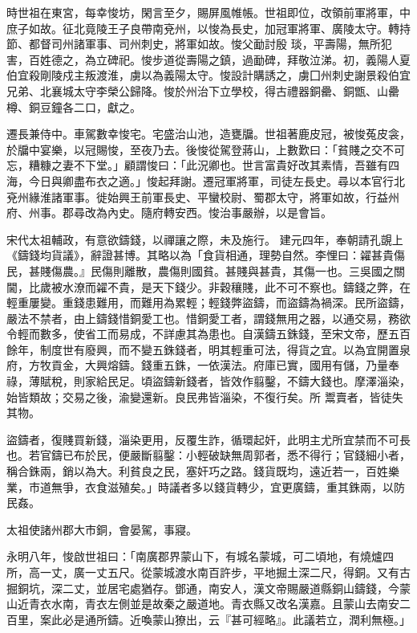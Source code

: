 \begin{pinyinscope}
 時世祖在東宮，每幸悛坊，閑言至夕，賜屏風帷帳。世祖即位，改領前軍將軍，中庶子如故。征北竟陵王子良帶南兗州，以悛為長史，加冠軍將軍、廣陵太守。轉持節、都督司州諸軍事、司州刺史，將軍如故。悛父勔討殷
 琰，平壽陽，無所犯害，百姓德之，為立碑祀。悛步道從壽陽之鎮，過勔碑，拜敬泣涕。初，義陽人夏伯宜殺剛陵戍主叛渡淮，虜以為義陽太守。悛設計購誘之，虜囗州刺史謝景殺伯宜兄弟、北襄城太守李榮公歸降。悛於州治下立學校，得古禮器銅罍、銅甑、山罍樽、銅豆鐘各二口，獻之。



 遷長兼侍中。車駕數幸悛宅。宅盛治山池，造甕牖。世祖著鹿皮冠，被悛菟皮衾，於牖中宴樂，以冠賜悛，至夜乃去。後悛從駕登蔣山，上數歎曰：「貧賤之交不可忘，糟糠之妻不下堂。」顧謂悛曰：「此況卿也。世言富貴好改其素情，吾雖有四海，今日與卿盡布衣之適。」悛起拜謝。遷冠軍將軍，司徒左長史。尋以本官行北兗州緣淮諸軍事。徙始興王前軍長史、平蠻校尉、蜀郡太守，將軍如故，行益州府、州事。郡尋改為內史。隨府轉安西。悛治事嚴辦，以是會旨。



 宋代太祖輔政，有意欲鑄錢，以禪讓之際，未及施行。
 建元四年，奉朝請孔覬上《鑄錢均貨議》，辭證甚博。其略以為「食貨相通，理勢自然。李悝曰：糴甚貴傷民，甚賤傷農。』民傷則離散，農傷則國貧。甚賤與甚貴，其傷一也。三吳國之關閫，比歲被水潦而糴不貴，是天下錢少。非穀穰賤，此不可不察也。鑄錢之弊，在輕重屢變。重錢患難用，而難用為累輕；輕錢弊盜鑄，而盜鑄為禍深。民所盜鑄，嚴法不禁者，由上鑄錢惜銅愛工也。惜銅愛工者，謂錢無用之器，以通交易，務欲令輕而數多，使省工而易成，不詳慮其為患也。自漢鑄五銖錢，至宋文帝，歷五百餘年，制度世有廢興，而不變五銖錢者，明其輕重可法，得貨之宜。以為宜開置泉府，方牧貢金，大興熔鑄。錢重五銖，一依漢法。府庫已實，國用有儲，乃量奉祿，薄賦稅，則家給民足。頃盜鑄新錢者，皆效作翦鑿，不鑄大錢也。摩澤淄染，始皆類故；交易之後，渝變還新。良民弗皆淄染，不復行矣。所
 鬻賣者，皆徒失其物。



 盜鑄者，復賤買新錢，淄染更用，反覆生詐，循環起奸，此明主尤所宜禁而不可長也。若官鑄已布於民，便嚴斷翦鑿：小輕破缺無周郭者，悉不得行；官錢細小者，稱合銖兩，銷以為大。利貧良之民，塞奸巧之路。錢貨既均，遠近若一，百姓樂業，市道無爭，衣食滋殖矣。」時議者多以錢貨轉少，宜更廣鑄，重其銖兩，以防民姦。



 太祖使諸州郡大市銅，會晏駕，事寢。



 永明八年，悛啟世祖曰：「南廣郡界蒙山下，有城名蒙城，可二頃地，有燒爐四所，高一丈，廣一丈五尺。從蒙城渡水南百許步，平地掘土深二尺，得銅。又有古掘銅坑，深二丈，並居宅處猶存。鄧通，南安人，漢文帝賜嚴道縣銅山鑄錢，今蒙山近青衣水南，青衣左側並是故秦之嚴道地。青衣縣又改名漢嘉。且蒙山去南安二百里，案此必是通所鑄。近喚蒙山獠出，云『甚可經略』。此議若立，潤利無極。」




\end{pinyinscope}
